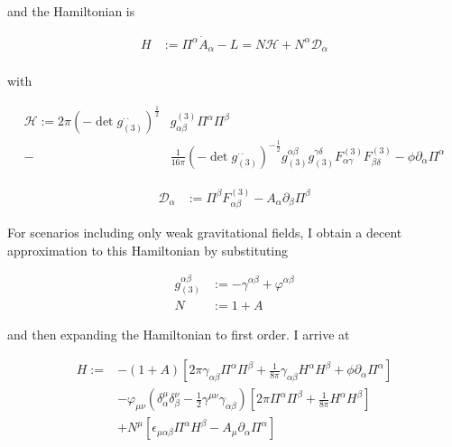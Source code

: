 \documentclass[11pt]{article}
\begin{document}
and the Hamiltonian is

\begin{align}
	H &:= \Pi^{\alpha} \dot{A}_{\alpha} - L = N \mathcal{H} + N^\alpha \mathcal{D}_{\alpha}\\
\end{align}

with 

\begin{equation}
\begin{split}
	\mathcal{H} :=  
	2 \pi \left( - \det{g_{(3)}^{\cdot \cdot}} \right)^{\frac{1}{2}} 
	& g_{\alpha \beta}^{(3)} \Pi^{\alpha} \Pi^{\beta} \\
	 - &\frac{1}{16 \pi} \left( - \det{g_{(3)}^{\cdot \cdot}} \right)^{- \frac{1}{2}} g_{(3)}^{\alpha \beta} g_{(3)}^{\gamma \delta } F^{(3)}_{\alpha \gamma}  F^{(3)}_{\beta \delta} 
	- \phi \partial_{\alpha} \Pi^{\alpha} 
\end{split}
\end{equation}

\begin{align}
	\mathcal{D}_{\alpha} &:= \Pi^{\beta} F^{(3)}_{\alpha \beta} -  A_{\alpha} 
	\partial_{\beta} \Pi^{\beta}
\end{align}


For scenarios including only weak gravitational fields, I obtain a decent approximation to this Hamiltonian by substituting  

\begin{align} 
	g_{(3)}^{\alpha \beta}  
	&:= - \gamma^{\alpha \beta} + \varphi^{\alpha \beta} \label{def_pert_met} \\
	N &:= 1 + A 
\end{align}
	
and then expanding the Hamiltonian to first order. I arrive at

\begin{equation} \label{mel_pert_ham}
\begin{split}
	H :=  
	& - \left( 1 + A \right) 
	\left[
	2 \pi \gamma_{\alpha \beta} \Pi^{\alpha} \Pi^{\beta}
	 + \frac{1}{8 \pi} \gamma_{\alpha \beta} H^{\alpha} H^{\beta}
	 + \phi \partial_{\alpha} \Pi^{\alpha}
	 \right]\\
	 & -  \varphi_{\mu \nu} 
	 \left( \delta_{\alpha}^{\mu}  \delta_{\beta}^{\nu} -  \frac{1}{2} \gamma^{\mu \nu } \gamma_{\alpha \beta} \right)
	 \left[
	 2 \pi  \Pi^{\alpha} \Pi^{\beta}
	 + \frac{1}{8 \pi} H^{\alpha} H^{\beta}
	 \right] \\
	 & + N^{\mu} \left[ 
	 \epsilon_{\mu \alpha \beta} \Pi^{\alpha} H^{\beta} -  A_{\mu} \partial_\alpha \Pi^\alpha
	 \right]
\end{split}
\end{equation}
\end{document}
